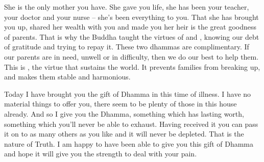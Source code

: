 She is the only mother you have. She gave you life, she has been your teacher, your doctor and your nurse -- she's been everything to you. That she has brought you up, shared her wealth with you and made you her heir is the great goodness of parents. That is why the Buddha taught the virtues of  and , knowing our debt of gratitude and trying to repay it. These two dhammas are complimentary. If our parents are in need, unwell or in difficulty, then we do our best to help them. This is , the virtue that sustains the world. It prevents families from breaking up, and makes them stable and harmonious. 

Today I have brought you the gift of Dhamma in this time of illness. I have no material things to offer you, there seem to be plenty of those in this house already. And so I give you the Dhamma, something which has lasting worth, something which you'll never be able to exhaust. Having received it you can pass it on to as many others as you like and it will never be depleted. That is the nature of Truth. I am happy to have been able to give you this gift of Dhamma and hope it will give you the strength to deal with your pain. 

